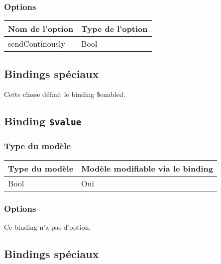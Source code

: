 \subsubsection{Options}

\begin{tabular}{|l|l|}
\hline
\textbf{Nom de l'option} & \textbf{Type de l'option}\\
\hline
sendContinously & Bool\\
\hline
\end{tabular}








\subsection{Bindings spéciaux}

Cette classe définit le binding \$enabled.

\subsection{Binding \texttt{\$value}}

\subsubsection{Type du modèle}

\begin{tabular}{|l|l|}
\hline
\textbf{Type du modèle} & \textbf{Modèle modifiable via le binding}\\
\hline
Bool & Oui\\
\hline
\end{tabular}
\subsubsection{Options}

Ce binding n'a pas d'option.









\subsection{Bindings spéciaux}

